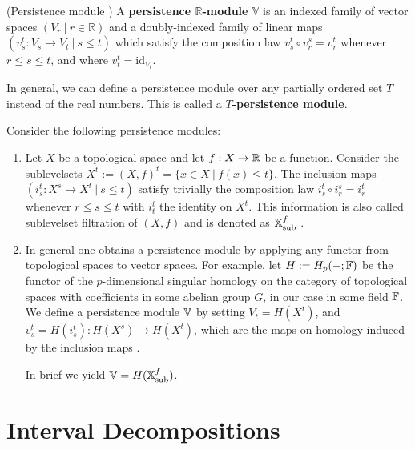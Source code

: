 \begin{definition}{(Persistence module \cite[§1.1]{chazal2016structure})}
A \textbf{persistence $\mathbb{R}$-module $\mathbb{V}$} is an indexed family of vector spaces $(V_r \ \vert \ r \in \mathbb{R})$ and a doubly-indexed family of linear maps $(v_s^t: V_s \rightarrow V_t \ \vert \ s \leq t)$ which satisfy the composition law $v_s^t \circ v_r^s = v_r^t$ whenever $r \leq s \leq t$, and where $v_t^t = \text{id}_{V_t}$. 
\end{definition}

\begin{remark}
In general, we can define a persistence module over any partially ordered set $T$ instead of the real numbers. This is called a {\bfseries $T$-persistence module}.
\end{remark}

\begin{example}
Consider the following persistence modules:
\begin{enumerate}
	\item Let $X$ be a topological space and let $f: X \rightarrow {\mathbb R}$ be a function. Consider the sublevelsets $X^t := (X,f)^t = \{ x \in X \ \vert \ f(x) \leq t \}$. The inclusion maps $(i_s^t: X^s \rightarrow X^t \ \vert \ s \leq t)$ satisfy trivially the composition law $i_s^t \circ i_r^s = i_r^t$ whenever $r \leq s \leq t$ with $i_t^t$ the identity on $X^t$. This information is also called sublevelset filtration of $(X,f)$ and is denoted as ${\mathbb X}_{\text{sub}}^f$ \cite[p.7]{chazal2016structure}.
	\item In general one obtains a persistence module by applying any functor from topological spaces to vector spaces. For example, let $H := H_p(-;{\mathbb F})$ be the functor of the $p$-dimensional singular homology on the category of topological spaces with coefficients in some abelian group $G$, in our case in some field ${\mathbb F}$. We define a persistence module ${\mathbb V}$ by setting $V_t = H(X^t)$, and $v_s^t = H(i_s^t): H(X^s) \rightarrow H(X^t)$, which are the maps on homology induced by the inclusion maps \cite[p.7]{chazal2016structure}.

	In brief we yield ${\mathbb V} = H({\mathbb X}_{\text{sub}}^f)$.
\end{enumerate}
\end{example}

\section{Interval Decompositions}
\label{intervaldecomposition}

